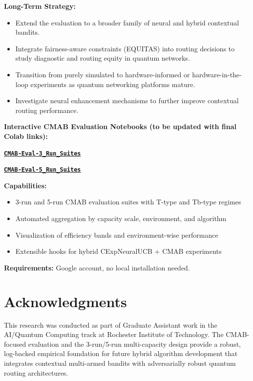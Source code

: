 \documentclass[12pt,a4paper]{article}
\newcommand{\colab}[1]{\textcolor{colabcolor}{\textbf{#1}}}
\begin{document}
\textbf{Long-Term Strategy:}
\begin{itemize}
\item Extend the evaluation to a broader family of neural and hybrid contextual bandits.
\item Integrate fairness-aware constraints (EQUITAS) into routing decisions to study diagnostic and routing equity in quantum networks.
\item Transition from purely simulated to hardware-informed or hardware-in-the-loop experiments as quantum networking platforms mature.
\item Investigate neural enhancement mechanisms to further improve contextual routing performance.
\end{itemize}

\begin{tcolorbox}[colback=colabcolor!20,colframe=colabcolor,title=\textbf{Interactive Framework Access (Placeholder Links)}]

\begin{center}
\textbf{Interactive CMAB Evaluation Notebooks (to be updated with final Colab links):}
\vspace{0.3cm}

\href{https://colab.research.google.com/drive/PLACEHOLDER_3_RUNS}{\colab{\texttt{CMAB-Eval-3\_Run\_Suites}}}

\href{https://colab.research.google.com/drive/PLACEHOLDER_5_RUNS}{\colab{\texttt{CMAB-Eval-5\_Run\_Suites}}}

\vspace{0.3cm}
\textbf{Capabilities:}
\begin{itemize}
\item 3-run and 5-run CMAB evaluation suites with T-type and Tb-type regimes
\item Automated aggregation by capacity scale, environment, and algorithm
\item Visualization of efficiency bands and environment-wise performance
\item Extensible hooks for hybrid CExpNeuralUCB + CMAB experiments
\end{itemize}

\textbf{Requirements:} Google account, no local installation needed.
\end{center}
\end{tcolorbox}

\section{Acknowledgments}

This research was conducted as part of Graduate Assistant work in the AI/Quantum Computing track at Rochester Institute of Technology. The CMAB-focused evaluation and the 3-run/5-run multi-capacity design provide a robust, log-backed empirical foundation for future hybrid algorithm development that integrates contextual multi-armed bandits with adversarially robust quantum routing architectures.
\end{document}
